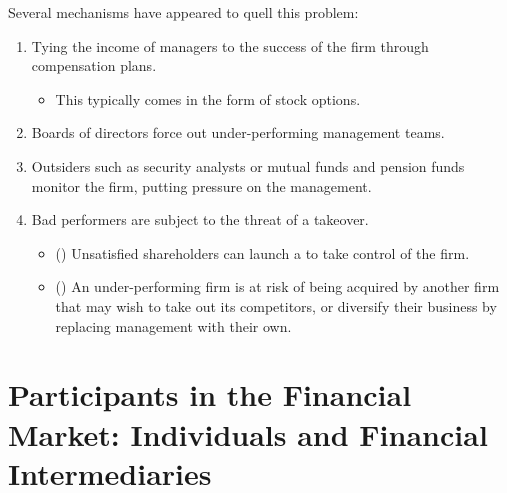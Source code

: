 \documentclass[notoc,notitlepage]{tufte-book}
\begin{document}
Several mechanisms have appeared to quell this problem:
\begin{enumerate}
  \item Tying the income of managers to the success of the firm through
    compensation plans.
    \begin{itemize}
      \item This typically comes in the form of stock options.
    \end{itemize}
  \item Boards of directors force out under-performing management teams.
  \item Outsiders such as security analysts or mutual funds and pension funds
    monitor the firm, putting pressure on the management.
  \item Bad performers are subject to the threat of a takeover.
    \begin{itemize}
      \item () Unsatisfied shareholders
        can launch a  to take control of the firm.
      \item () An under-performing firm is at risk
        of being acquired by another firm that may wish to take out its
        competitors, or diversify their business by replacing management
        with their own.
    \end{itemize}
\end{enumerate}



\section{Participants in the Financial Market: Individuals and Financial Intermediaries}%
\label{sec:participants_in_the_financial_market_individuals_and_financial_intermediaries}
\end{document}

